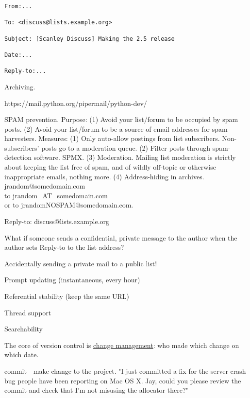 \documentclass[landscape,30pt]{foils}
\begin{document}
{\tiny
\begin{verbatim}
From:...

To: <discuss@lists.example.org>

Subject: [Scanley Discuss] Making the 2.5 release

Date:...

Reply-to:...
\end{verbatim}
}


Archiving.

https://mail.python.org/pipermail/python-dev/
  
SPAM prevention.  Purpose: (1) Avoid your list/forum to be occupied by spam posts.  (2) Avoid your list/forum to be a source of email addresses for spam harvesters.  Measures: (1) Only auto-allow postings from list subscribers. Non-subscribers' posts go to a moderation queue.  (2)  Filter posts through spam-detection software. SPMX.  (3)  Moderation.  Mailing list moderation
is strictly about keeping the list free of spam, and of wildly off-topic or otherwise inappropriate emails, nothing more. (4) Address-hiding in archives. jrandom@somedomain.com \\to jrandom\_AT\_somedomain.com \\or to jrandomNOSPAM@somedomain.com.


Reply-to: discuss@lists.example.org

What if someone sends a confidential, private message to the author when the author sets Reply-to to the list address?

Accidentally sending a private mail to a public list!



Prompt updating (instantaneous, every hour)

Referential stability (keep the same URL)

Thread support

Searchability


The core of version control is \underline{change management}: who made which change on which date.

commit - make change to the project.  "I just committed a fix for the server crash bug people have been reporting on Mac OS X. Jay, could you please review the commit and check that I'm not misusing the allocator there?"
\end{document}
